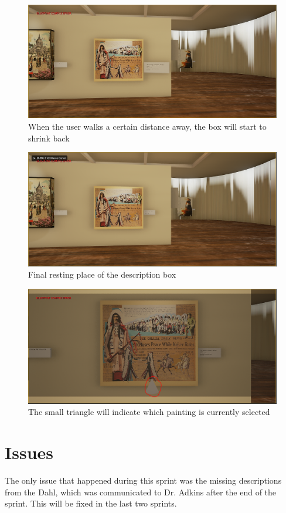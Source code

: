 \documentclass[11pt]{book}
\begin{document}
	\begin{figure}
		\caption{When the user walks a certain distance away, the box will start to shrink back}
		\includegraphics[scale=0.5]{Screenshots/Animation4.png}
		\centering
	\end{figure}
	\begin{figure}
		\caption{Final resting place of the description box}
		\includegraphics[scale=0.5]{Screenshots/Animation5.png}
		\centering
	\end{figure}


	\begin{figure}
		\caption{The small triangle will indicate which painting is currently selected}
		\includegraphics[scale=0.5]{Screenshots/Menu.png}
		\centering
	\end{figure}

\section*{Issues}
The only issue that happened during this sprint was the missing descriptions from the Dahl, which was communicated to Dr. Adkins after the end of the sprint.  This will be fixed in the last two sprints.
\end{document}
